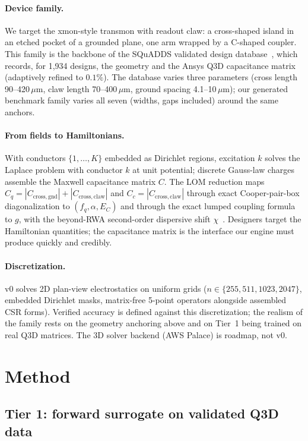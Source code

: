 \documentclass[11pt]{article}
\begin{document}
\paragraph{Device family.} We target the xmon-style transmon with readout
claw: a cross-shaped island in an etched pocket of a grounded plane, one arm
wrapped by a C-shaped coupler. This family is the backbone of the SQuADDS
validated design database~\cite{squadds}, which records, for 1{,}934 designs,
the geometry and the Ansys Q3D capacitance matrix (adaptively refined to
$0.1\%$). The database varies three parameters (cross length 90--420\,$\mu$m,
claw length 70--400\,$\mu$m, ground spacing 4.1--10\,$\mu$m); our generated
benchmark family varies all seven (widths, gaps included) around the same
anchors.

\paragraph{From fields to Hamiltonians.} With conductors
$\{1,\dots,K\}$ embedded as Dirichlet regions, excitation $k$ solves the
Laplace problem with conductor $k$ at unit potential; discrete Gauss-law
charges assemble the Maxwell capacitance matrix $C$. The LOM reduction maps
$C_q = |C_{\mathrm{cross,gnd}}| + |C_{\mathrm{cross,claw}}|$ and
$C_c = |C_{\mathrm{cross,claw}}|$ through exact Cooper-pair-box
diagonalization to $(f_q, \alpha, E_C)$ and through the exact lumped coupling
formula to $g$, with the beyond-RWA second-order dispersive shift
$\chi$~\cite{koch,squadds}. Designers target the Hamiltonian quantities; the
capacitance matrix is the interface our engine must produce quickly and
credibly.

\paragraph{Discretization.} v0 solves 2D plan-view electrostatics on uniform
grids ($n \in \{255, 511, 1023, 2047\}$, embedded Dirichlet masks,
matrix-free 5-point operators alongside assembled CSR forms). Verified
accuracy is defined against this discretization; the realism of the family
rests on the geometry anchoring above and on Tier~1 being trained on real Q3D
matrices. The 3D solver backend (AWS Palace) is roadmap, not v0.

\section{Method}
\label{sec:method}

\subsection{Tier 1: forward surrogate on validated Q3D data}
\end{document}
